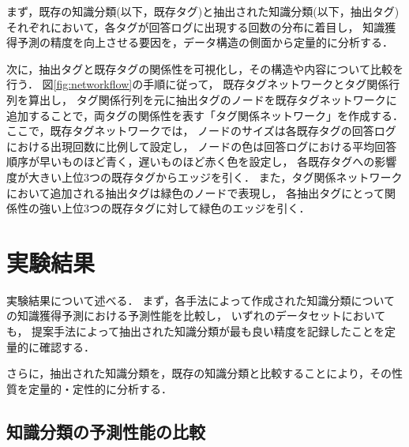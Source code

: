 まず，既存の知識分類(以下，既存タグ)と抽出された知識分類(以下，抽出タグ)それぞれにおいて，各タグが回答ログに出現する回数の分布に着目し，
知識獲得予測の精度を向上させる要因を，データ構造の側面から定量的に分析する．

次に，抽出タグと既存タグの関係性を可視化し，その構造や内容について比較を行う．
図\ref{fig:networkflow}の手順に従って，
既存タグネットワークとタグ関係行列を算出し，
タグ関係行列を元に抽出タグのノードを既存タグネットワークに追加することで，両タグの関係性を表す「タグ関係ネットワーク」を作成する．
ここで，既存タグネットワークでは，
ノードのサイズは各既存タグの回答ログにおける出現回数に比例して設定し，
ノードの色は回答ログにおける平均回答順序が早いものほど青く，遅いものほど赤く色を設定し，
各既存タグへの影響度が大きい上位3つの既存タグからエッジを引く．
また，タグ関係ネットワークにおいて追加される抽出タグは緑色のノードで表現し，
各抽出タグにとって関係性の強い上位3つの既存タグに対して緑色のエッジを引く．




\section{実験結果}
実験結果について述べる．
まず，各手法によって作成された知識分類についての知識獲得予測における予測性能を比較し，
いずれのデータセットにおいても，
提案手法によって抽出された知識分類が最も良い精度を記録したことを定量的に確認する．

さらに，抽出された知識分類を，既存の知識分類と比較することにより，その性質を定量的・定性的に分析する．



\subsection{知識分類の予測性能の比較}

